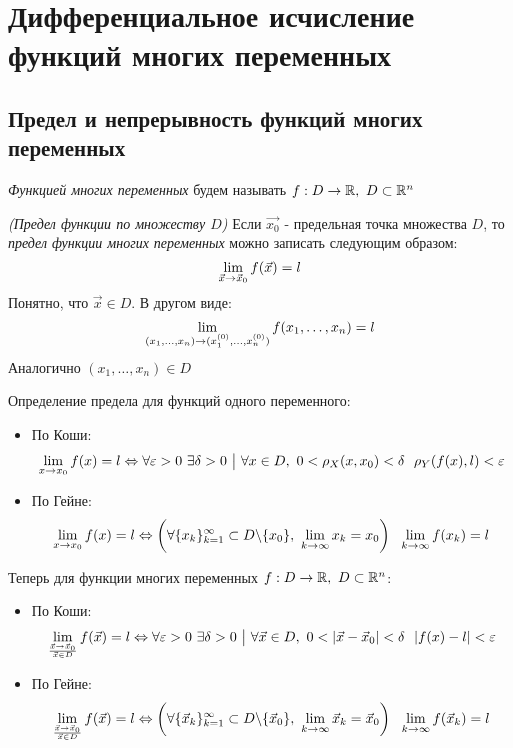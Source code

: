 
\section{Дифференциальное исчисление функций многих переменных}

\subsection{Предел и непрерывность функций многих переменных}

\begin{definition}
	\textit{Функцией многих переменных} будем называть $f: D \to \mathbb{R},\ D \subset \mathbb{R}^n$
\end{definition}

\begin{definition}
	\textit{(Предел функции по множеству $D$)} Если $\vec{x_0}$ - предельная точка множества $D$, то \textit{предел функции многих переменных} можно записать следующим образом:
	\[
		\lim\limits_{\vec{x} \to \vec{x}_0} f(\vec{x}) = l
	\]
	Понятно, что $\vec{x} \in D$. В другом виде:
	\[
		\lim\limits_{(x_1, \ldots, x_n) \to (x_1^{(0)}, \ldots, x_n^{(0)})} f(x_1, \ldots, x_n) = l
	\]
	Аналогично $(x_1, \ldots, x_n) \in D$ 
	
	Определение предела для функций одного переменного:
	\begin{itemize}
		\item По Коши:
		\[
			\liml_{x \to x_0} f(x) = l \lra \forall \eps > 0\ \exists \delta > 0 \such \forall x \in D,\ 0 < \rho_X (x, x_0) < \delta\ \ \rho_Y(f(x), l) < \eps
		\]
		
		\item По Гейне:
		\[
			\liml_{x \to x_0} f(x) = l \lra \left(\forall \{x_k\}_{k = 1}^\infty \subset D \bs \{x_0\},\ \liml_{k \to \infty} x_k = x_0\right)\ \ \liml_{k \to \infty} f(x_k) = l
		\]
	\end{itemize}
	Теперь для функции многих переменных $f: D \to \mathbb{R},\ D \subset \mathbb{R}^n$:
	\begin{itemize}
		\item По Коши:
		\[
			\liml_{\vec{x} \to \vec{x}_0 \over \vec{x} \in D} f(\vec{x}) = l \lra \forall \eps > 0\ \exists \delta > 0 \such \forall \vec{x} \in D,\ 0 < |\vec{x} - \vec{x}_0| < \delta\ \ |f(x) - l| < \eps
		\]
		
		\item По Гейне:
		\[
			\lim\limits_{\vec{x} \to \vec{x}_0 \over \vec{x} \in D} f(\vec{x}) = l \Leftrightarrow \left(\forall \{\vec{x}_k\}_{k = 1}^\infty \subset D \backslash \{\vec{x}_0\},\ \lim\limits_{k \to \infty} \vec{x}_k = \vec{x}_0\right)\ \ \lim\limits_{k \to \infty} f(\vec{x}_k) = l
		\]
	\end{itemize}
\end{definition}

